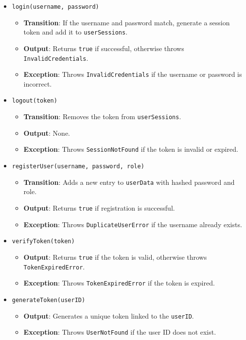 \documentclass[12pt, titlepage]{article}
\begin{document}
\begin{itemize}
    \item \texttt{login(username, password)}
    \begin{itemize}
        \item \textbf{Transition}: If the username and password match, generate a session token and add it to \texttt{userSessions}.
        \item \textbf{Output}: Returns \texttt{true} if successful, otherwise throws \texttt{InvalidCredentials}.
        \item \textbf{Exception}: Throws \texttt{InvalidCredentials} if the username or password is incorrect.
    \end{itemize}

    \item \texttt{logout(token)}
    \begin{itemize}
        \item \textbf{Transition}: Removes the token from \texttt{userSessions}.
        \item \textbf{Output}: None.
        \item \textbf{Exception}: Throws \texttt{SessionNotFound} if the token is invalid or expired.
    \end{itemize}

    \item \texttt{registerUser(username, password, role)}
    \begin{itemize}
        \item \textbf{Transition}: Adds a new entry to \texttt{userData} with hashed password and role.
        \item \textbf{Output}: Returns \texttt{true} if registration is successful.
        \item \textbf{Exception}: Throws \texttt{DuplicateUserError} if the username already exists.
    \end{itemize}

    \item \texttt{verifyToken(token)}
    \begin{itemize}
        \item \textbf{Output}: Returns \texttt{true} if the token is valid, otherwise throws \texttt{TokenExpiredError}.
        \item \textbf{Exception}: Throws \texttt{TokenExpiredError} if the token is expired.
    \end{itemize}

    \item \texttt{generateToken(userID)}
    \begin{itemize}
        \item \textbf{Output}: Generates a unique token linked to the \texttt{userID}.
        \item \textbf{Exception}: Throws \texttt{UserNotFound} if the user ID does not exist.
    \end{itemize}
\end{itemize}
\end{document}
